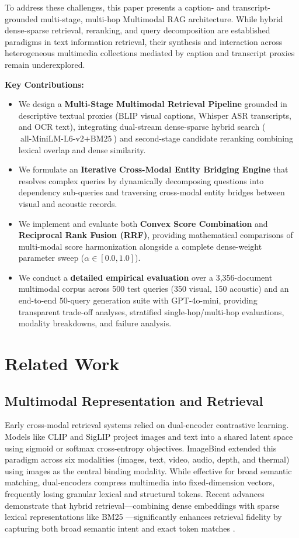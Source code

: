 \documentclass[conference]{IEEEtran}
\begin{document}
To address these challenges, this paper presents a caption- and transcript-grounded multi-stage, multi-hop Multimodal RAG architecture. While hybrid dense-sparse retrieval, reranking, and query decomposition are established paradigms in text information retrieval, their synthesis and interaction across heterogeneous multimedia collections mediated by caption and transcript proxies remain underexplored. 

\textbf{Key Contributions:}
\begin{itemize}
    \item We design a \textbf{Multi-Stage Multimodal Retrieval Pipeline} grounded in descriptive textual proxies (BLIP visual captions, Whisper ASR transcripts, and OCR text), integrating dual-stream dense-sparse hybrid search ($\text{all-MiniLM-L6-v2} + \text{BM25}$) and second-stage candidate reranking combining lexical overlap and dense similarity.
    \item We formulate an \textbf{Iterative Cross-Modal Entity Bridging Engine} that resolves complex queries by dynamically decomposing questions into dependency sub-queries and traversing cross-modal entity bridges between visual and acoustic records.
    \item We implement and evaluate both \textbf{Convex Score Combination} and \textbf{Reciprocal Rank Fusion (RRF)}, providing mathematical comparisons of multi-modal score harmonization alongside a complete dense-weight parameter sweep ($\alpha \in [0.0, 1.0]$).
    \item We conduct a \textbf{detailed empirical evaluation} over a 3,356-document multimodal corpus across 500 test queries (350 visual, 150 acoustic) and an end-to-end 50-query generation suite with GPT-4o-mini, providing transparent trade-off analyses, stratified single-hop/multi-hop evaluations, modality breakdowns, and failure analysis.
\end{itemize}

\section{Related Work}

\subsection{Multimodal Representation and Retrieval}
Early cross-modal retrieval systems relied on dual-encoder contrastive learning. Models like CLIP \cite{radford2021clip} and SigLIP \cite{zhai2023siglip} project images and text into a shared latent space using sigmoid or softmax cross-entropy objectives. ImageBind \cite{girdhar2023imagebind} extended this paradigm across six modalities (images, text, video, audio, depth, and thermal) using images as the central binding modality. While effective for broad semantic matching, dual-encoders compress multimedia into fixed-dimension vectors, frequently losing granular lexical and structural tokens. Recent advances demonstrate that hybrid retrieval—combining dense embeddings with sparse lexical representations like BM25 \cite{robertson2009bm25}—significantly enhances retrieval fidelity by capturing both broad semantic intent and exact token matches \cite{karpukhin2020dpr}.
\end{document}
